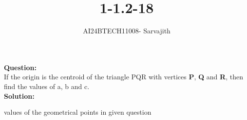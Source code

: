 \documentclass[journal]{IEEEtran}
\begin{document}

\vspace{3cm}

\title{1-1.2-18}
\author{AI24BTECH11008- Sarvajith
}
{\let\newpage\relax\maketitle}

\renewcommand{\thefigure}{\theenumi}
\renewcommand{\thetable}{\theenumi}
\setlength{\intextsep}{10pt} %


\renewcommand{\thetable}{\theenumi}
\textbf{Question: }\\
If the origin is the centroid of the triangle PQR with vertices
\textbf{P}, \textbf{Q} and \textbf{R}, then find the values of a, b and
c.\\
\textbf{Solution: }\\
\begin{table}[h!]    
  \centering
    
      \caption{values of the geometrical points in given question}
        \label{tab1-1.2-18-1}
	\end{table}
\end{document}
